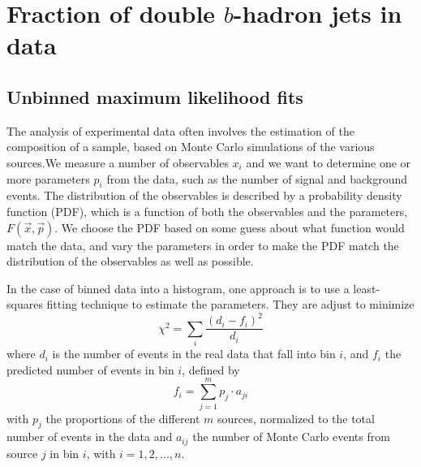 
%
\chapter{Fraction of double $b$-hadron jets in data}\label{ch:gbbfraction}

\section{Unbinned maximum likelihood fits}\label{sec:LLFits}

The analysis of experimental data often involves the estimation of the composition of a sample, based on Monte Carlo simulations of the various sources.We measure a number of observables $x_i$ and we want to determine one or more parameters $p_i$ from the data, such as the number of signal and background events. The distribution  of the observables is described by a probability density function (PDF), which is a function of both the observables and the parameters, $F(\vec{x},\vec{p})$.  We choose the PDF based on some guess about what function would match the data, and vary the parameters in order to make the PDF match the distribution of the observables as well as possible. 


In the case of binned data into a histogram, one approach is to use a least-squares fitting technique to estimate the parameters. They are adjust to minimize
%
\begin{equation}
\chi^2 = \sum_i \frac{(d_i - f_i)^2}{d_i}
 \label{eq:chi2}
\end{equation}
%
where $d_i$ is the number of events in the real data that fall into bin $i$, and $f_i$ the predicted number of events in bin $i$, defined by
%
\begin{equation}
f_i = \sum^m_{j=1} p_j \cdot a_{ji}
\end{equation}
%
with $p_j$ the proportions of the different $m$ sources, normalized to the total number of events in the data and $a_{ij}$ the number of Monte Carlo events from source $j$ in bin $i$, with $i=1,2,...,n$.

